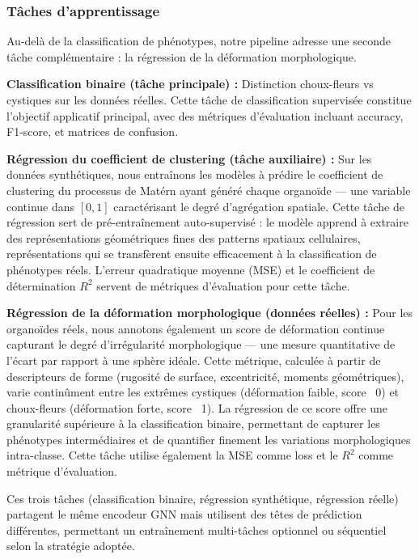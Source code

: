 \subsubsection{Tâches d'apprentissage}

Au-delà de la classification de phénotypes, notre pipeline adresse une seconde tâche complémentaire : la régression de la déformation morphologique.

\textbf{Classification binaire (tâche principale) :}
Distinction choux-fleurs vs cystiques sur les données réelles. Cette tâche de classification supervisée constitue l'objectif applicatif principal, avec des métriques d'évaluation incluant accuracy, F1-score, et matrices de confusion.

\textbf{Régression du coefficient de clustering (tâche auxiliaire) :}
Sur les données synthétiques, nous entraînons les modèles à prédire le coefficient de clustering du processus de Matérn ayant généré chaque organoïde — une variable continue dans $[0, 1]$ caractérisant le degré d'agrégation spatiale. Cette tâche de régression sert de pré-entraînement auto-supervisé : le modèle apprend à extraire des représentations géométriques fines des patterns spatiaux cellulaires, représentations qui se transfèrent ensuite efficacement à la classification de phénotypes réels. L'erreur quadratique moyenne (MSE) et le coefficient de détermination $R^2$ servent de métriques d'évaluation pour cette tâche.

\textbf{Régression de la déformation morphologique (données réelles) :}
Pour les organoïdes réels, nous annotons également un score de déformation continue capturant le degré d'irrégularité morphologique — une mesure quantitative de l'écart par rapport à une sphère idéale. Cette métrique, calculée à partir de descripteurs de forme (rugosité de surface, excentricité, moments géométriques), varie continûment entre les extrêmes cystiques (déformation faible, score ~0) et choux-fleurs (déformation forte, score ~1). La régression de ce score offre une granularité supérieure à la classification binaire, permettant de capturer les phénotypes intermédiaires et de quantifier finement les variations morphologiques intra-classe. Cette tâche utilise également la MSE comme loss et le $R^2$ comme métrique d'évaluation.

Ces trois tâches (classification binaire, régression synthétique, régression réelle) partagent le même encodeur GNN mais utilisent des têtes de prédiction différentes, permettant un entraînement multi-tâches optionnel ou séquentiel selon la stratégie adoptée.

